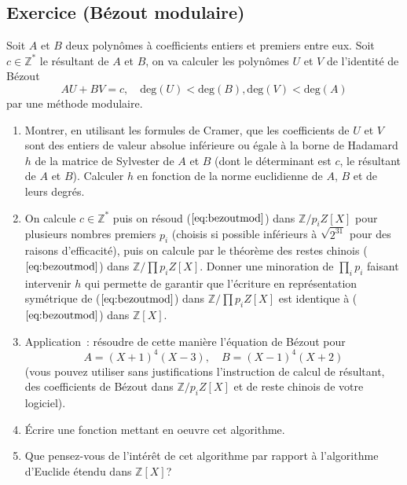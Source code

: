 \documentclass[a4paper,11pt]{article}
\begin{document}
\begin{giacjshere}
\subsection{Exercice (Bézout modulaire)}
Soit $A$ et $B$ deux polynômes à coefficients entiers et premiers
entre eux. Soit $c \in \mathbb{Z}^* $ le résultant de $A$ et $B$,
on va calculer les polynômes $U$ et $V$ de l'identité de Bézout 
\begin{equation} \label{eq:bezoutmod}
 A U + B V = c , \quad \mbox{deg}(U)<\mbox{deg}(B), \mbox{deg}(V)<\mbox{deg}(A)
\end{equation}
par une méthode modulaire.
\begin{enumerate}
\item Montrer, en utilisant les formules de Cramer,
que les coefficients de $U$ et $V$ sont des entiers de
valeur absolue inférieure ou égale à la borne de Hadamard $h$ de
la matrice de Sylvester de $A$ et $B$ (dont le déterminant est $c$,
le résultant de $A$ et $B$). Calculer $h$ en fonction
de la norme euclidienne de $A$, $B$ et de leurs degr\'es. 
\item On calcule $c \in \mathbb{Z}^*$ puis on
résoud (\(\ref{eq:bezoutmod}\)) dans $\mathbb{Z}/p_i Z[X]$ pour
plusieurs nombres premiers $p_i$ (choisis si possible inférieurs 
à $\sqrt{2^{31}}$ pour des raisons d'efficacité), puis on calcule par le
théorème des restes chinois (\(\ref{eq:bezoutmod}\)) 
dans $\mathbb{Z}/\prod p_i Z[X]$. Donner une minoration de 
$\prod_i p_i$ faisant intervenir $h$ qui permette de garantir
que l'écriture en représentation symétrique de (\(\ref{eq:bezoutmod}\))
dans $\mathbb{Z}/\prod p_i Z[X]$ est identique \`a (\(\ref{eq:bezoutmod}\)) dans $\mathbb{Z}[X]$.
\item Application~: résoudre de cette manière l'équation de
Bézout pour 
\[ A=(X+1)^4(X-3), \quad B=(X-1)^4(X+2)\] 
(vous pouvez utiliser
sans justifications l'instruction de calcul de r\'esultant,
des coefficients de Bézout dans $\mathbb{Z}/p_iZ[X]$ et 
de reste chinois de votre logiciel).
\item \'Ecrire une fonction mettant en oeuvre cet algorithme.
\item Que pensez-vous de l'intérêt de cet algorithme par rapport à
l'algorithme d'Euclide étendu dans $\mathbb{Z}[X]$?
\end{enumerate}



\end{giacjshere}
\end{document}
